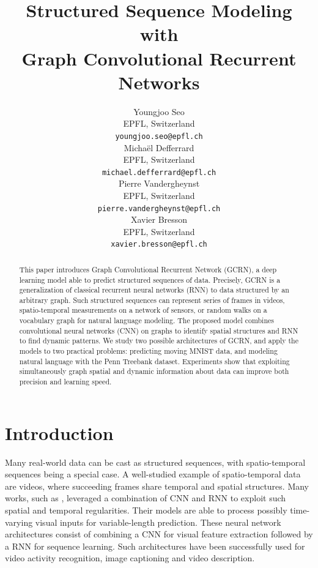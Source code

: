 \documentclass{article} %
\title{Structured Sequence Modeling with \\ Graph Convolutional Recurrent Networks}
\author{Youngjoo Seo \\
EPFL, Switzerland \\
\texttt{youngjoo.seo@epfl.ch} \\
\And
Michaël Defferrard \\
EPFL, Switzerland \\
\texttt{michael.defferrard@epfl.ch} \\
\And
Pierre Vandergheynst \\
EPFL, Switzerland \\
\texttt{pierre.vandergheynst@epfl.ch} \\
\And
Xavier Bresson \\
EPFL, Switzerland \\
\texttt{xavier.bresson@epfl.ch} 
}
\begin{document}
\maketitle

\begin{abstract}
	This paper introduces Graph Convolutional Recurrent
	Network (GCRN), a deep learning model able to predict structured
	sequences of data. Precisely, GCRN is a generalization of classical recurrent neural networks (RNN) to
	data structured by an arbitrary graph. 
	Such structured sequences can represent series of frames in videos, spatio-temporal measurements on a network of
	sensors, or random walks on a vocabulary graph for natural language modeling.
	The proposed model combines convolutional neural networks (CNN) on graphs to identify spatial structures and RNN to find dynamic patterns. We study two possible architectures of GCRN, and apply the models to two practical
	problems: predicting moving MNIST data, and modeling natural language with the Penn
	Treebank dataset. Experiments show that exploiting simultaneously graph spatial and dynamic information about data can improve both precision and learning speed.
\end{abstract}

	

\section{Introduction}


Many real-world data can be cast as structured sequences, with spatio-temporal
sequences being a special case. A well-studied example of spatio-temporal data are videos, where
succeeding frames share temporal and spatial structures. Many works, such as \citet{cnnlstm1, cnnlstm2, cnnlstm3},  leveraged a combination of CNN and RNN to exploit such spatial and
temporal regularities. Their models are able to process possibly time-varying
visual inputs for variable-length prediction. These neural network architectures consist of combining
a CNN for visual feature extraction followed by a RNN for sequence learning. Such
architectures have been successfully used for video activity recognition, image
captioning and video description.
\end{document}
